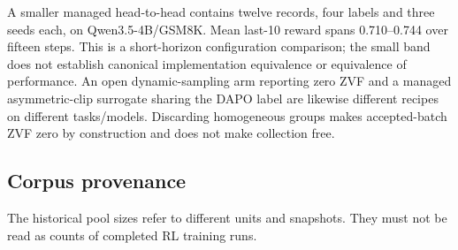 \documentclass[12pt,a4paper]{report}
\begin{document}
A smaller managed head-to-head contains twelve records, four labels and
three seeds each, on Qwen3.5-4B/GSM8K. Mean last-10 reward spans
0.710--0.744 over fifteen steps. This is a short-horizon configuration
comparison; the small band does not establish canonical implementation
equivalence or equivalence of performance. An open dynamic-sampling arm
reporting zero ZVF and a managed asymmetric-clip surrogate sharing the
DAPO label are likewise different recipes on different tasks/models.
Discarding homogeneous groups makes accepted-batch ZVF zero by
construction and does not make collection free.

\subsection{Corpus provenance}\label{corpus-provenance}

The historical pool sizes refer to different units and snapshots. They
must not be read as counts of completed RL training runs.
\end{document}
